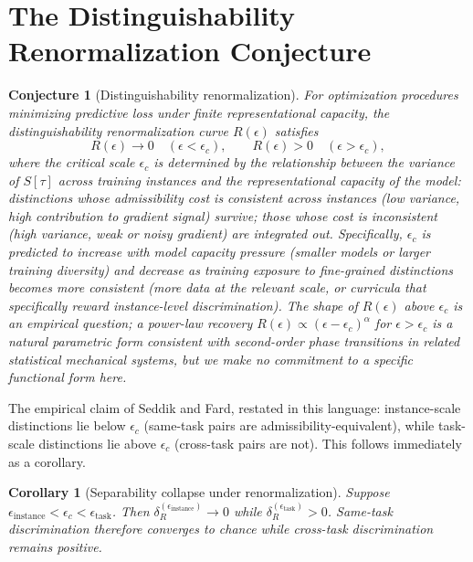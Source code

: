 \documentclass[11pt]{article}
\newtheorem{corollary}{Corollary}
\newtheorem{conjecture}{Conjecture}
\begin{document}
\section{The Distinguishability Renormalization Conjecture}

\begin{conjecture}[Distinguishability renormalization]
\label{conj:main}
For optimization procedures minimizing predictive loss under finite representational capacity,
the distinguishability renormalization curve $R(\epsilon)$ satisfies
\begin{equation}
R(\epsilon) \to 0 \quad (\epsilon < \epsilon_c), \qquad R(\epsilon) > 0 \quad (\epsilon > \epsilon_c),
\end{equation}
where the critical scale $\epsilon_c$ is determined by the relationship between the variance of
$S[\tau]$ across training instances and the representational capacity of the model: distinctions
whose admissibility cost is consistent across instances (low variance, high contribution to
gradient signal) survive; those whose cost is inconsistent (high variance, weak or noisy
gradient) are integrated out. Specifically, $\epsilon_c$ is predicted to increase with model
capacity pressure (smaller models or larger training diversity) and decrease as training
exposure to fine-grained distinctions becomes more consistent (more data at the relevant scale,
or curricula that specifically reward instance-level discrimination). The shape of $R(\epsilon)$
above $\epsilon_c$ is an empirical question; a power-law recovery $R(\epsilon) \propto
(\epsilon - \epsilon_c)^\alpha$ for $\epsilon > \epsilon_c$ is a natural parametric form
consistent with second-order phase transitions in related statistical mechanical systems, but
we make no commitment to a specific functional form here.
\end{conjecture}

The empirical claim of Seddik and Fard, restated in this language: instance-scale distinctions
lie below $\epsilon_c$ (same-task pairs are admissibility-equivalent), while task-scale
distinctions lie above $\epsilon_c$ (cross-task pairs are not). This follows immediately as a
corollary.

\begin{corollary}[Separability collapse under renormalization]
\label{prop:sep}
Suppose $\epsilon_{\mathrm{instance}} < \epsilon_c < \epsilon_{\mathrm{task}}$. Then
$\delta_R^{(\epsilon_{\mathrm{instance}})} \to 0$ while $\delta_R^{(\epsilon_{\mathrm{task}})}
> 0$. Same-task discrimination therefore converges to chance while cross-task discrimination
remains positive.
\end{corollary}
\end{document}
